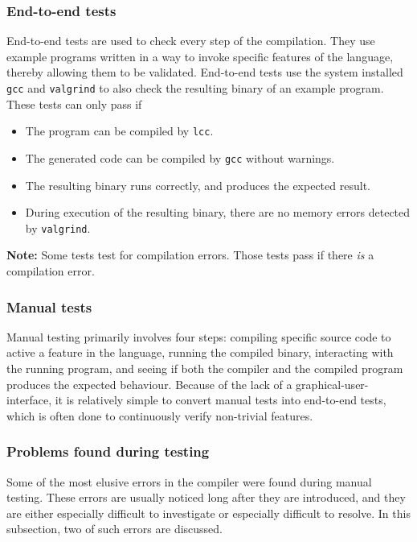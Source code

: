 \documentclass[12pt]{article}
\begin{document}
\subsubsection{End-to-end tests}

End-to-end tests are used to check every step of the compilation. They use
example programs written in a way to invoke specific features of the language,
thereby allowing them to be validated. End-to-end tests use the system installed
\verb$gcc$ and \verb$valgrind$ to also check the resulting binary of an example
program. These tests can only pass if
\begin{itemize}
    \item The program can be compiled by \verb$lcc$.
    \item The generated code can be compiled by \verb$gcc$ without warnings.
    \item The resulting binary runs correctly, and produces the expected result.
    \item During execution of the resulting binary, there are no memory errors
        detected by \verb$valgrind$.
\end{itemize}
\textbf{Note:} Some tests test for compilation errors. Those tests pass if there
\emph{is} a compilation error.

\subsubsection{Manual tests}

Manual testing primarily involves four steps: compiling specific source code to
active a feature in the language, running the compiled binary, interacting with
the running program, and seeing if both the compiler and the compiled program
produces the expected behaviour. Because of the lack of a
graphical-user-interface, it is relatively simple to convert manual tests into
end-to-end tests, which is often done to continuously verify non-trivial
features.

\subsubsection{Problems found during testing} %

Some of the most elusive errors in the compiler were found during manual
testing. These errors are usually noticed long after they are introduced, and
they are either especially difficult to investigate or especially difficult to
resolve. In this subsection, two of such errors are discussed.
\end{document}
